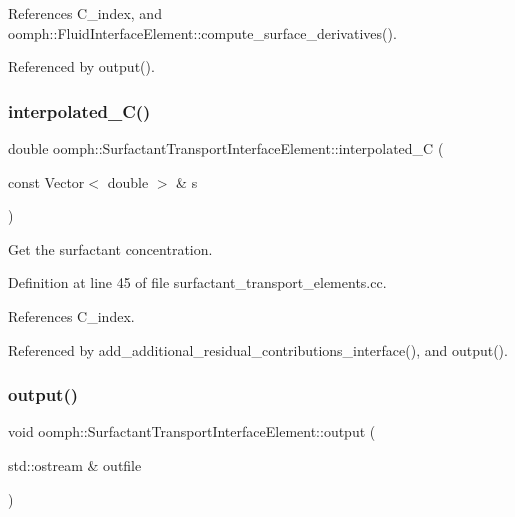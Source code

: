 References C\+\_\+index, and oomph\+::\+Fluid\+Interface\+Element\+::compute\+\_\+surface\+\_\+derivatives().



Referenced by output().

\mbox{\label{classoomph_1_1SurfactantTransportInterfaceElement_a9da12df06b20e5f1ce0736acfc7e8d83}} 
\subsubsection{\texorpdfstring{interpolated\+\_\+\+C()}{interpolated\_C()}}
{\footnotesize\ttfamily double oomph\+::\+Surfactant\+Transport\+Interface\+Element\+::interpolated\+\_\+C (\begin{DoxyParamCaption}\item[{const Vector$<$ double $>$ \&}]{s }\end{DoxyParamCaption})\hspace{0.3cm}{\ttfamily [protected]}}



Get the surfactant concentration. 



Definition at line 45 of file surfactant\+\_\+transport\+\_\+elements.\+cc.



References C\+\_\+index.



Referenced by add\+\_\+additional\+\_\+residual\+\_\+contributions\+\_\+interface(), and output().

\mbox{\label{classoomph_1_1SurfactantTransportInterfaceElement_a280f065d9cb85438c0fe4f7cd95d14b3}} 
\subsubsection{\texorpdfstring{output()}{output()}\hspace{0.1cm}{\footnotesize\ttfamily [1/4]}}
{\footnotesize\ttfamily void oomph\+::\+Surfactant\+Transport\+Interface\+Element\+::output (\begin{DoxyParamCaption}\item[{std\+::ostream \&}]{outfile }\end{DoxyParamCaption})\hspace{0.3cm}{\ttfamily [inline]}}



